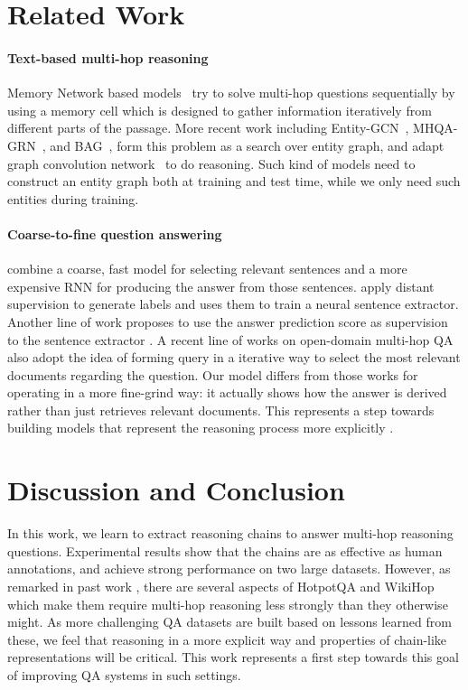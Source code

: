 \documentclass[11pt,a4paper]{article}
\begin{document}
\section{Related Work}

\paragraph{Text-based multi-hop reasoning}
Memory Network based models~\citep{weston2015towards,sukhbaatar2015end,kumar2016ask,dhingra2016gated,shen2017reasonet} try to solve multi-hop questions sequentially by using a memory cell which is designed to gather information iteratively from different parts of the passage. More recent work including Entity-GCN~\citep{de2018question}, MHQA-GRN~\citep{song2018exploring}, and BAG~\citep{cao2019bag}, form this problem as a search over entity graph, and adapt graph convolution network~\cite{kipf2017semi} to do reasoning. Such kind of models need to construct an entity graph both at training and test time, while we only need such entities during training.

\paragraph{Coarse-to-fine question answering}
 combine a coarse, fast model for selecting relevant sentences and a more expensive RNN for producing the answer from those sentences.  apply distant supervision to generate labels and uses them to train a neural sentence extractor. Another line of work proposes to use the answer prediction score as supervision to the sentence extractor \citep{wang2018r,indurthi2018cut,min2018efficient}. A recent line of works on open-domain multi-hop QA~\cite{feldman2019multi, das2019multi, asai2019learning, qi2019answering, godbole2019multi} also adopt the idea of forming query in a iterative way to select the most relevant documents regarding the question. Our model differs from those works for operating in a more fine-grind way: it actually shows how the answer is derived rather than just retrieves relevant documents. This represents a step towards building models that represent the reasoning process more explicitly \citep{trivedi2019repurposing, jiang2019explore}.

\section{Discussion and Conclusion}
In this work, we learn to extract reasoning chains to answer multi-hop reasoning questions. Experimental results show that the chains are as effective as human annotations, and achieve strong performance on two large datasets. However, as remarked in past work \citep{chen2019understanding,min2019compositional}, there are several aspects of HotpotQA and WikiHop which make them require multi-hop reasoning less strongly than they otherwise might. As more challenging QA datasets are built based on lessons learned from these, we feel that reasoning in a more explicit way and properties of chain-like representations will be critical. This work represents a first step towards this goal of improving QA systems in such settings.



\end{document}
